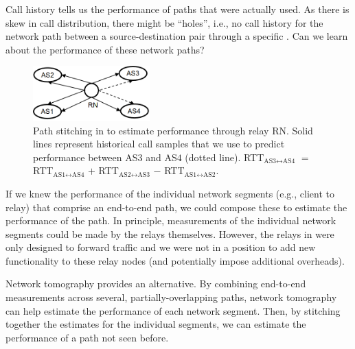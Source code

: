 Call history tells us the performance of paths that were actually used. 
As there is skew in call distribution, there might be ``holes'', i.e., no call history for the network path between a source-destination pair through a specific \option. 
Can we learn about the performance of these network paths? 

\begin{figure}[t!]
\centering
\includegraphics[width=0.4\textwidth]{figures/Via-Tomography.png}
\caption{Path stitching in \hybrid to estimate performance through relay RN. Solid lines represent historical call samples that we use to predict performance between AS$3$ and AS$4$ (dotted line). RTT$_{\text{AS3}\leftrightarrow\text{AS4}}$ $=$ RTT$_{\text{AS1}\leftrightarrow\text{AS4}}$ $+$ RTT$_{\text{AS2}\leftrightarrow\text{AS3}}$ $-$ RTT$_{\text{AS1}\leftrightarrow\text{AS2}}$.}
\label{fig:tomography}
\end{figure}

If we knew the performance of the individual network segments (e.g., client to relay) that comprise an end-to-end path, we could compose these to estimate the performance of the path. In principle, measurements of the individual network segments could be made by the relays themselves. However, the relays in \skype were only designed to forward traffic and we were not in a position to add new functionality to these relay nodes (and potentially impose additional overheads). 

 
Network tomography provides an alternative. By combining end-to-end measurements across several, partially-overlapping paths, network tomography can help estimate the performance of each network segment. Then, by stitching together the estimates for the individual segments, we can estimate the performance of a path not seen before.

